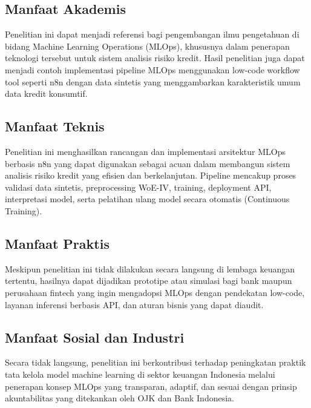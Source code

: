 \subsection*{Manfaat Akademis} Penelitian ini dapat menjadi referensi bagi pengembangan ilmu pengetahuan di bidang Machine Learning Operations (MLOps), khususnya dalam penerapan teknologi tersebut untuk sistem analisis risiko kredit. Hasil penelitian juga dapat menjadi contoh implementasi pipeline MLOps menggunakan low-code workflow tool seperti n8n dengan data sintetis yang menggambarkan karakteristik umum data kredit konsumtif.
\subsection*{Manfaat Teknis} Penelitian ini menghasilkan rancangan dan implementasi arsitektur MLOps berbasis n8n yang dapat digunakan sebagai acuan dalam membangun sistem analisis risiko kredit yang efisien dan berkelanjutan. Pipeline mencakup proses validasi data sintetis, preprocessing WoE-IV, training, deployment API, interpretasi model, serta pelatihan ulang model secara otomatis (Continuous Training).
\subsection*{Manfaat Praktis} Meskipun penelitian ini tidak dilakukan secara langsung di lembaga keuangan tertentu, hasilnya dapat dijadikan prototipe atau simulasi bagi bank maupun perusahaan fintech yang ingin mengadopsi MLOps dengan pendekatan low-code, layanan inferensi berbasis API, dan aturan bisnis yang dapat diaudit.
\subsection*{Manfaat Sosial dan Industri} Secara tidak langsung, penelitian ini berkontribusi terhadap peningkatan praktik tata kelola model machine learning di sektor keuangan Indonesia melalui penerapan konsep MLOps yang transparan, adaptif, dan sesuai dengan prinsip akuntabilitas yang ditekankan oleh OJK dan Bank Indonesia.

